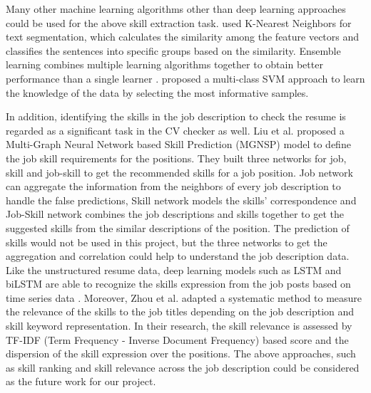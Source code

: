 Many other machine learning algorithms other than deep learning approaches could be used for the above skill extraction task. \cite{jo2017using} used K-Nearest Neighbors for text segmentation, which calculates the similarity among the feature vectors and classifies the sentences into specific groups based on the similarity. Ensemble learning combines multiple learning algorithms together to obtain better performance than a single learner \cite{enwiki:1100411098}. \cite{goudjil2018novel} proposed a multi-class SVM approach to learn the knowledge of the data by selecting the most informative samples. 

In addition, identifying the skills in the job description to check the resume is regarded as a significant task in the CV checker as well. Liu et al. \cite{liu2021learning} proposed a Multi-Graph Neural Network based Skill Prediction (MGNSP) model to define the job skill requirements for the positions. They built three networks for job, skill and job-skill to get the recommended skills for a job position. Job network can aggregate the information from the neighbors of every job description to handle the false predictions, Skill network models the skills' correspondence and Job-Skill network combines the job descriptions and skills together to get the suggested skills from the similar descriptions of the position. The prediction of skills would not be used in this project, but the three networks to get the aggregation and correlation could help to understand the job description data. Like the unstructured resume data, deep learning models such as LSTM and biLSTM are able to recognize the skills expression from the job posts based on time series data \cite{baad2019automatic}. Moreover, Zhou et al. \cite{zhou2016quantifying} adapted a systematic method to measure the relevance of the skills to the job titles depending on the job description and skill keyword representation. In their research, the skill relevance is assessed by TF-IDF (Term Frequency - Inverse Document Frequency) based score and the dispersion of the skill expression over the positions. The above approaches, such as skill ranking and skill relevance across the job description could be considered as the future work for our project.